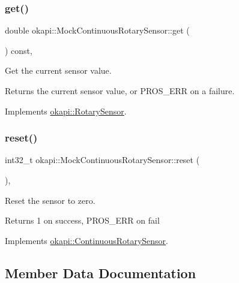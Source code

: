 \subsubsection{\texorpdfstring{get()}{get()}}
{\footnotesize\ttfamily double okapi\+::\+Mock\+Continuous\+Rotary\+Sensor\+::get (\begin{DoxyParamCaption}{ }\end{DoxyParamCaption}) const\hspace{0.3cm}{\ttfamily [override]}, {\ttfamily [virtual]}}



Get the current sensor value. 

\begin{DoxyReturn}{Returns}
the current sensor value, or {\ttfamily P\+R\+O\+S\+\_\+\+E\+RR} on a failure. 
\end{DoxyReturn}


Implements \mbox{\hyperlink{classokapi_1_1RotarySensor_ac5534dc6c3bcbd8ea2f4e54a04cda734}{okapi\+::\+Rotary\+Sensor}}.

\mbox{\label{classokapi_1_1MockContinuousRotarySensor_aef9f58389e38fee29453983cf2179934}} 
\subsubsection{\texorpdfstring{reset()}{reset()}}
{\footnotesize\ttfamily int32\+\_\+t okapi\+::\+Mock\+Continuous\+Rotary\+Sensor\+::reset (\begin{DoxyParamCaption}{ }\end{DoxyParamCaption})\hspace{0.3cm}{\ttfamily [override]}, {\ttfamily [virtual]}}



Reset the sensor to zero. 

\begin{DoxyReturn}{Returns}
1 on success, P\+R\+O\+S\+\_\+\+E\+RR on fail 
\end{DoxyReturn}


Implements \mbox{\hyperlink{classokapi_1_1ContinuousRotarySensor_ae7268b0603097ac2d93a67e4fefa43e0}{okapi\+::\+Continuous\+Rotary\+Sensor}}.



\subsection{Member Data Documentation}
\mbox{\label{classokapi_1_1MockContinuousRotarySensor_a7daf5e6388d826b904be99029f0c2e20}} 
